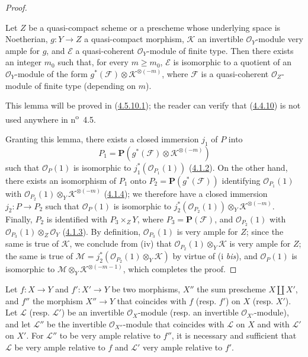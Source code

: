 \begin{proof}
\begin{lemma}[4.4.10.1]
\label{II.4.4.10.1}
Let $Z$ be a quasi-compact scheme or a prescheme whose underlying space
is Noetherian, $g:Y\to Z$ a quasi-compact morphism, $\mathcal{K}$ an
invertible $\mathcal{O}_Y$-module very ample for $g$, and $\mathcal{E}$ a
quasi-coherent $\mathcal{O}_Y$-module of finite type. Then there exists an
integer $m_0$ such that, for every $m\geq m_0$, $\mathcal{E}$ is isomorphic to
a quotient of an $\mathcal{O}_Y$-module of the form
$g^*(\mathcal{F})\otimes\mathcal{K}^{\otimes(-m)}$, where $\mathcal{F}$ is a
quasi-coherent $\mathcal{O}_Z$-module of finite type (depending on $m$).
\end{lemma}

This lemma will be proved in (\hyperref[II.4.5.10.1]{4.5.10.1}); the reader
can verify that (\hyperref[II.4.4.10]{4.4.10}) is not used anywhere
in n\textsuperscript{o}~4.5.


Granting this lemma, there exists a closed immersion $j_1$ of $P$ into
\[
  P_1=\mathbf{P}(g^*(\mathcal{F})\otimes\mathcal{K}^{\otimes(-m)})
\]
such that $\mathcal{O}_P(1)$ is isomorphic to
$j_1^*(\mathcal{O}_{P_1}(1))$ (\hyperref[II.4.1.2]{4.1.2}). On the other
hand, there exists an isomorphism of $P_1$ onto
$P_2=\mathbf{P}(g^*(\mathcal{F}))$ identifying
$\mathcal{O}_{P_1}(1)$ with
$\mathcal{O}_{P_2}(1)\otimes_Y\mathcal{K}^{\otimes(-m)}$
(\hyperref[II.4.1.4]{4.1.4}); we therefore have a closed immersion
$j_2:P\to P_2$ such that $\mathcal{O}_P(1)$ is isomorphic to
$j_2^*(\mathcal{O}_{P_2}(1))\otimes_Y\mathcal{K}^{\otimes(-m)}$. Finally,
$P_2$ is identified with $P_3\times_ZY$, where $P_3=\mathbf{P}(\mathcal{F})$,
and $\mathcal{O}_{P_2}(1)$ with
$\mathcal{O}_{P_3}(1)\otimes_Z\mathcal{O}_Y$
(\hyperref[II.4.1.3]{4.1.3}). By definition,
$\mathcal{O}_{P_3}(1)$ is very ample for $Z$; since the same is true of
$\mathcal{K}$, we conclude from (iv) that
$\mathcal{O}_{P_2}(1)\otimes_Y\mathcal{K}$ is very ample for $Z$; the same is
true of
$\mathcal{M}=j_2^*(\mathcal{O}_{P_2}(1)\otimes_Y\mathcal{K})$ by virtue of
(i \emph{bis}), and $\mathcal{O}_P(1)$ is isomorphic to
$\mathcal{M}\otimes_Y\mathcal{K}^{\otimes(-m-1)}$, which completes the
proof.
\end{proof}

\begin{proposition}[4.4.11]
\label{II.4.4.11}
Let $f:X\to Y$ and $f':X'\to Y$ be two morphisms, $X''$ the sum prescheme
$X\amalg X'$, and $f''$ the morphism $X''\to Y$ that coincides with $f$ \textup{(resp.
$f'$)} on $X$ \textup{(resp. $X'$)}. Let $\mathcal{L}$ \textup{(resp. $\mathcal{L}'$)} be an
invertible $\mathcal{O}_X$-module \textup{(resp.} an invertible
$\mathcal{O}_{X'}$-module\textup{)}, and let $\mathcal{L}''$ be the invertible
$\mathcal{O}_{X''}$-module that coincides with $\mathcal{L}$ on $X$ and with
$\mathcal{L}'$ on $X'$. For $\mathcal{L}''$ to be very ample relative to
$f''$, it is necessary and sufficient that $\mathcal{L}$ be very ample
relative to $f$ and $\mathcal{L}'$ very ample relative to $f'$.
\end{proposition}


